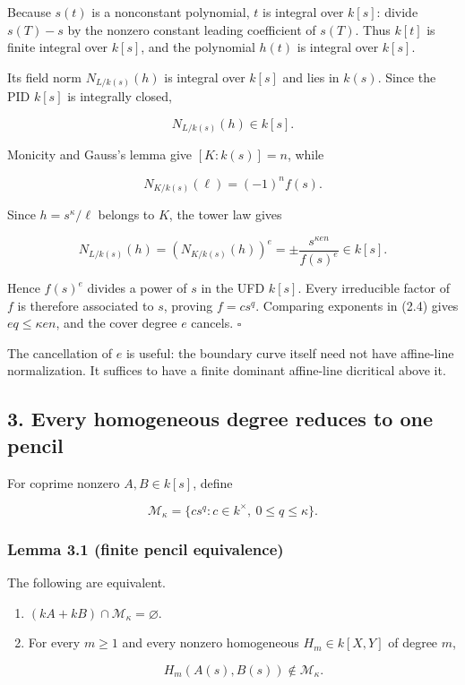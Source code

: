 \documentclass[
  11pt,
  a4paper,
]{article}
\begin{document}
Because \(s(t)\) is a nonconstant polynomial, \(t\) is integral over
\(k[s]\): divide \(s(T)-s\) by the nonzero constant leading coefficient
of \(s(T)\). Thus \(k[t]\) is finite integral over \(k[s]\), and the
polynomial \(h(t)\) is integral over \(k[s]\).

Its field norm \(N_{L/k(s)}(h)\) is integral over \(k[s]\) and lies in
\(k(s)\). Since the PID \(k[s]\) is integrally closed,

\[
N_{L/k(s)}(h)\in k[s].
\tag{2.3}
\]

Monicity and Gauss's lemma give \([K:k(s)]=n\), while

\[
N_{K/k(s)}(\ell)=(-1)^nf(s).
\]

Since \(h=s^\kappa/\ell\) belongs to \(K\), the tower law gives

\[
N_{L/k(s)}(h)
=\left(N_{K/k(s)}(h)\right)^e
=\pm\frac{s^{\kappa en}}{f(s)^e}
\in k[s].
\tag{2.4}
\]

Hence \(f(s)^e\) divides a power of \(s\) in the UFD \(k[s]\). Every
irreducible factor of \(f\) is therefore associated to \(s\), proving
\(f=cs^q\). Comparing exponents in (2.4) gives \(eq\le\kappa en\), and
the cover degree \(e\) cancels. \(\square\)

The cancellation of \(e\) is useful: the boundary curve itself need not
have affine-line normalization. It suffices to have a finite dominant
affine-line dicritical above it.

\subsection{3. Every homogeneous degree reduces to one
pencil}\label{every-homogeneous-degree-reduces-to-one-pencil}

For coprime nonzero \(A,B\in k[s]\), define

\[
\mathcal M_\kappa=
\{cs^q:c\in k^\times,\ 0\le q\le\kappa\}.
\]

\subsubsection{Lemma 3.1 (finite pencil
equivalence)}\label{lemma-3.1-finite-pencil-equivalence}

The following are equivalent.

\begin{enumerate}
\def\labelenumi{\arabic{enumi}.}
\item
  \((kA+kB)\cap\mathcal M_\kappa=\varnothing\).
\item
  For every \(m\ge1\) and every nonzero homogeneous \(H_m\in k[X,Y]\) of
  degree \(m\),

  \[
  H_m(A(s),B(s))\notin\mathcal M_\kappa.
  \tag{3.1}
  \]
\end{enumerate}
\end{document}
